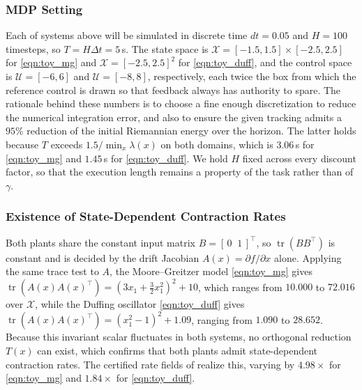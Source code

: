 \documentclass[lettersize,journal]{IEEEtran}
\begin{document}
\subsubsection{MDP Setting}
Each of systems above will be simulated in discrete time $dt = 0.05$ and $H=100$ timesteps, 
so $T = H \Delta t = 5$\,s. 
The state space is $\mathcal{X} = [-1.5, 1.5] \times [-2.5, 2.5]$ for \eqref{eqn:toy_mg} 
and $\mathcal{X} = [-2.5, 2.5]^2$ for \eqref{eqn:toy_duff}, 
and the control space is $\mathcal{U} = [-6, 6]$ and $\mathcal{U} = [-8, 8]$, respectively, 
each twice the box from which the reference control is drawn so that feedback always has authority to spare. 
The rationale behind these numbers is to choose a fine enough discretization to reduce the numerical integration error, 
and also to ensure the given tracking admits a $95\%$ reduction of the initial Riemannian energy over the horizon. 
The latter holds because $T$ exceeds $1.5 / \min_x \lambda(x)$ on both domains, 
which is $3.06$\,s for \eqref{eqn:toy_mg} and $1.45$\,s for \eqref{eqn:toy_duff}. 
We hold $H$ fixed across every discount factor, 
so that the execution length remains a property of the task rather than of $\gamma$.

\subsubsection{Existence of State-Dependent Contraction Rates}
Both plants share the constant input matrix $B = [\,0 \;\; 1\,]^\top$, 
so $\operatorname{tr}(BB^\top)$ is constant and  is decided by the drift Jacobian $A(x) = \partial f / \partial x$ alone. 
Applying the same trace test to $A$, the Moore--Greitzer model \eqref{eqn:toy_mg} gives 
$\operatorname{tr}(A(x)A(x)^\top) = (3x_1 + \tfrac{3}{2}x_1^2)^2 + 10$, 
which ranges from $10.000$ to $72.016$ over $\mathcal{X}$, 
while the Duffing oscillator \eqref{eqn:toy_duff} gives 
$\operatorname{tr}(A(x)A(x)^\top) = (x_1^2 - 1)^2 + 1.09$, ranging from $1.090$ to $28.652$. 
Because this invariant scalar fluctuates in both systems, no orthogonal reduction $T(x)$ can exist, 
which confirms that both plants admit state-dependent contraction rates. 
The certified rate fields of  realize this, 
varying by $4.98\times$ for \eqref{eqn:toy_mg} and $1.84\times$ for \eqref{eqn:toy_duff}.
\end{document}
